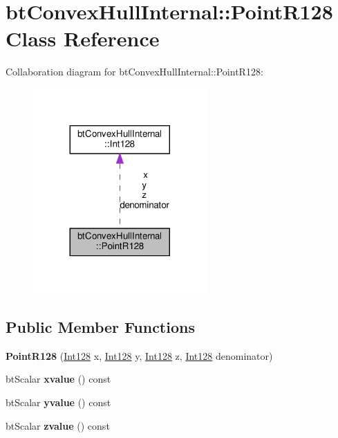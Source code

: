\hypertarget{classbtConvexHullInternal_1_1PointR128}{}\section{bt\+Convex\+Hull\+Internal\+:\+:Point\+R128 Class Reference}
\label{classbtConvexHullInternal_1_1PointR128}


Collaboration diagram for bt\+Convex\+Hull\+Internal\+:\+:Point\+R128\+:
\nopagebreak
\begin{figure}[H]
\begin{center}
\leavevmode
\includegraphics[width=188pt]{classbtConvexHullInternal_1_1PointR128__coll__graph}
\end{center}
\end{figure}
\subsection*{Public Member Functions}
\begin{DoxyCompactItemize}
\item 
\mbox{\label{classbtConvexHullInternal_1_1PointR128_a254a97a2fd7f9a30fb065188d4d6c78a}} 
{\bfseries Point\+R128} (\hyperlink{classbtConvexHullInternal_1_1Int128}{Int128} x, \hyperlink{classbtConvexHullInternal_1_1Int128}{Int128} y, \hyperlink{classbtConvexHullInternal_1_1Int128}{Int128} z, \hyperlink{classbtConvexHullInternal_1_1Int128}{Int128} denominator)
\item 
\mbox{\label{classbtConvexHullInternal_1_1PointR128_aea521693e47a03b10dda0cc0d791b2b6}} 
bt\+Scalar {\bfseries xvalue} () const
\item 
\mbox{\label{classbtConvexHullInternal_1_1PointR128_a692fc0686b02607abb3490d51342ea88}} 
bt\+Scalar {\bfseries yvalue} () const
\item 
\mbox{\label{classbtConvexHullInternal_1_1PointR128_a05916745add59e34d507d42846728e6c}} 
bt\+Scalar {\bfseries zvalue} () const
\end{DoxyCompactItemize}
